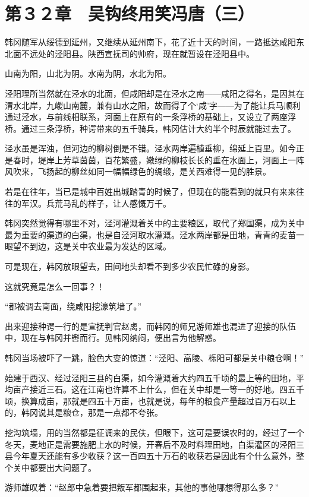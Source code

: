 \section{第３２章　吴钩终用笑冯唐（三）}

韩冈随军从绥德到延州，又继续从延州南下，花了近十天的时间，一路抵达咸阳东北面不远处的泾阳县。陕西宣抚司的帅府，现在就暂设在泾阳县中。

山南为阳，山北为阴。水南为阴，水北为阳。

泾阳理所当然就在泾水的北面，但咸阳却是在泾水之南——咸阳之得名，是因其在渭水北岸，九嵕山南麓，兼有山水之阳，故而得了个‘咸’字——为了能让兵马顺利通过泾水，与前线相联系，河面上在原有的一条浮桥的基础上，又设立了两座浮桥。通过三条浮桥，种谔带来的五千骑兵，韩冈估计大约半个时辰就能过去了。

泾水虽是浑浊，但河边的柳树倒是不错。泾水两岸遍植垂柳，绵延上百里。如今正是春时，堤岸上芳草茵茵，百花繁盛，嫩绿的柳枝长长的垂在水面上，河面上一阵风吹来，飞扬起的柳丝如同一幅幅绿色的绸缎，是关西难得一见的胜景。

若是在往年，当已是城中百姓出城踏青的时候了，但现在的能看到的就只有来来往往的军汉。兵荒马乱的样子，让人感慨万千。

韩冈突然觉得有哪里不对，泾河灌溉着关中的主要粮区，取代了郑国渠，成为关中最为重要的渠道的白渠，也是自泾河取水灌溉。泾水两岸都是田地，青青的麦苗一眼望不到边，这是关中农业最为发达的区域。

可是现在，韩冈放眼望去，田间地头却看不到多少农民忙碌的身影。

这就究竟是怎么一回事？！

“都被调去南面，绕咸阳挖濠筑墙了。”

出来迎接种谔一行的是宣抚判官赵禼，而韩冈的师兄游师雄也混进了迎接的队伍中，现在与韩冈并辔而行。见韩冈纳闷，便出言为他解惑。

韩冈当场被吓了一跳，脸色大变的惊道：“泾阳、高陵、栎阳可都是关中粮仓啊！”

始建于西汉、经过泾阳三县的白渠，如今灌溉着大约四五千顷的最上等的田地，平均亩产接近三石。这在江南也许算不上什么，但在关中却是一等一的好地。四五千顷，换算成亩，那就是四五十万亩，也就是说，每年的粮食产量超过百万石以上的，韩冈说其是粮仓，那是一点都不夸张。

挖沟筑墙，用的当然都是征调来的民伕，但眼下，这可是要误农时的，经过了一个冬天，麦地正是需要施肥上水的时候，开春后不及时料理田地，白渠灌区的泾阳三县今年夏天还能有多少收获？这一百四五十万石的收获若是因此有个什么意外，整个关中都要出大问题了。

游师雄叹着：“赵郎中急着要把叛军都围起来，其他的事他哪想得那么多？”

